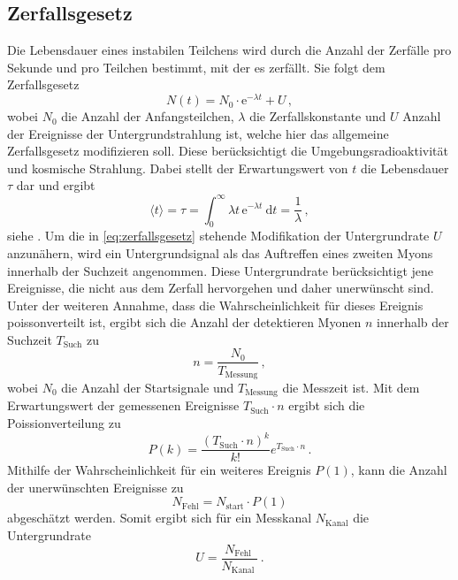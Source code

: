 \subsection{Zerfallsgesetz}
\label{subsec:Zerfallsgesetz}

Die Lebensdauer eines instabilen Teilchens wird durch die Anzahl der Zerfälle pro Sekunde 
und pro Teilchen bestimmt, mit der es zerfällt. 
Sie folgt dem Zerfallsgesetz
\begin{equation} \label{eq:zerfallsgesetz}
    N(t) = N_0 \cdot \mathrm{e}^{-\lambda t} + U \, ,
\end{equation}
wobei $N_0$ die Anzahl der Anfangsteilchen, $\lambda$ die Zerfallskonstante
und $U$ Anzahl der Ereignisse der Untergrundstrahlung ist, 
welche hier das allgemeine Zerfallsgesetz modifizieren soll.
Diese berücksichtigt die Umgebungsradioaktivität und kosmische Strahlung.
Dabei stellt der Erwartungswert von $t$ die Lebensdauer $\tau$ dar und ergibt
\begin{equation} \label{eq:tau}
    \langle t\rangle=\tau=\int_0^{\infty} \lambda t \, \mathrm{e}^{-\lambda t} \mathrm{~d} t=\frac{1}{\lambda} \, ,
\end{equation}
siehe \cite{demtroeder4}. Um die in \autoref{eq:zerfallsgesetz} stehende Modifikation der Untergrundrate $U$ anzunähern,
wird ein Untergrundsignal als das Auftreffen eines zweiten Myons innerhalb der Suchzeit angenommen.
Diese Untergrundrate berücksichtigt jene Ereignisse, 
die nicht aus dem Zerfall hervorgehen und daher unerwünscht sind.
Unter der weiteren Annahme, 
dass die Wahrscheinlichkeit für dieses Ereignis poissonverteilt ist, 
ergibt sich die Anzahl der detektieren Myonen $n$ innerhalb der Suchzeit $T_\text{Such}$ zu
\begin{equation*}
    n=\frac{N_{0}}{T_{\text{Messung}}} \, ,
\end{equation*}
wobei $N_0$ die Anzahl der Startsignale und $T_{\text{Messung}}$ die Messzeit ist.
Mit dem Erwartungswert der gemessenen Ereignisse $T_\text{Such} \cdot n$ ergibt sich die Poissionverteilung zu
\begin{equation*}
    P(k)=\frac{\left(T_{\mathrm{Such}} \cdot n\right)^k}{k !} e^{T_{ \mathrm{Such}} \cdot n} \, .
\end{equation*}
Mithilfe der Wahrscheinlichkeit für ein weiteres Ereignis $P(1)$, 
kann die Anzahl der unerwünschten Ereignisse zu
\begin{equation*}
    N_{\mathrm{Fehl}}=N_{\mathrm{start}} \cdot P(1)
\end{equation*}
abgeschätzt werden.
Somit ergibt sich für ein Messkanal $N_\text{Kanal}$ die Untergrundrate
\begin{equation}\label{eq:untergrundrate}
    U=\frac{N_{\text {Fehl }}}{N_{\text {Kanal }}} \, .
\end{equation}


